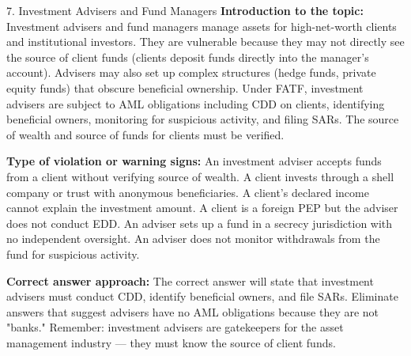 \documentclass[11pt,a4paper]{beamer}
\begin{document}
\begin{frame}{7. Investment Advisers and Fund Managers}
\tiny
\noindent\textbf{Introduction to the topic:} Investment advisers and fund managers manage assets for high-net-worth clients and institutional investors. They are vulnerable because they may not directly see the source of client funds (clients deposit funds directly into the manager's account). Advisers may also set up complex structures (hedge funds, private equity funds) that obscure beneficial ownership. Under FATF, investment advisers are subject to AML obligations including CDD on clients, identifying beneficial owners, monitoring for suspicious activity, and filing SARs. The source of wealth and source of funds for clients must be verified.

\vspace{0.1cm}
\noindent\textbf{Type of violation or warning signs:} An investment adviser accepts funds from a client without verifying source of wealth. A client invests through a shell company or trust with anonymous beneficiaries. A client's declared income cannot explain the investment amount. A client is a foreign PEP but the adviser does not conduct EDD. An adviser sets up a fund in a secrecy jurisdiction with no independent oversight. An adviser does not monitor withdrawals from the fund for suspicious activity.

\vspace{0.1cm}
\noindent\textbf{Correct answer approach:} The correct answer will state that investment advisers must conduct CDD, identify beneficial owners, and file SARs. Eliminate answers that suggest advisers have no AML obligations because they are not "banks." Remember: investment advisers are gatekeepers for the asset management industry — they must know the source of client funds.
\end{frame}
\end{document}
